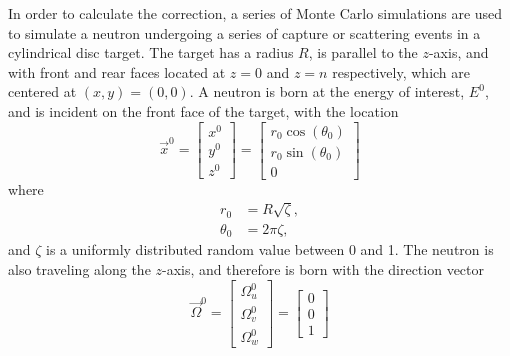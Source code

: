 In order to calculate the correction, a series of Monte Carlo simulations are used to simulate a neutron undergoing a series of capture or scattering events in a cylindrical disc target. The target has a radius $R$, is parallel to the $z$-axis, and with front and rear faces located at $z=0$ and $z=n$ respectively, which are centered at $(x,y)=(0,0)$. A neutron is born at the energy of interest, $E^0$, and is incident on the front face of the target, with the location
\begin{equation}
    \label{eq:incident-neutron-location}
    \overrightarrow{x}^0 = \begin{bmatrix}
        x^0 \\
        y^0 \\
        z^0
    \end{bmatrix} =
    \begin{bmatrix} 
        r_0\cos{\left( \theta_0 \right)} \\
        r_0\sin{\left( \theta_0 \right)} \\
        0
    \end{bmatrix}
\end{equation}
where
\begin{align*}
    r_0 &= R\sqrt{\zeta}, \\
    \theta_0 &= 2\pi\zeta,
\end{align*}
and $\zeta$ is a uniformly distributed random value between 0 and 1. The neutron is also traveling along the $z$-axis, and therefore is born with the direction vector
\begin{equation}
    \label{eq:incident-neutron-location}
    \overrightarrow{\Omega}^0 = \begin{bmatrix}
        \Omega^0_u \\
        \Omega^0_v \\
        \Omega^0_w
    \end{bmatrix} =
    \begin{bmatrix}
        0 \\
        0 \\
        1
    \end{bmatrix}
\end{equation}

